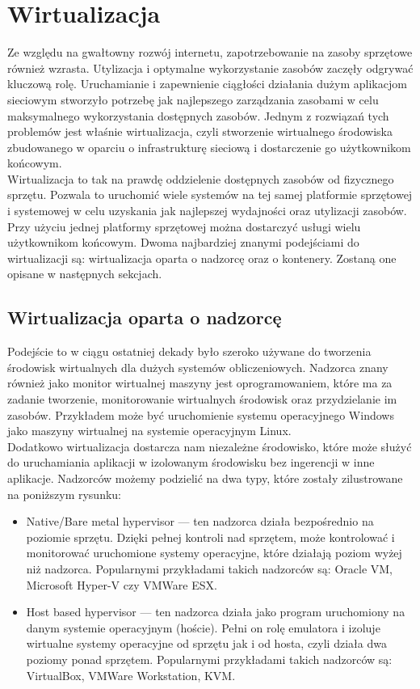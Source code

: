 \documentclass[12pt]{report}
\let\Oldsection\section
\renewcommand{\section}{\FloatBarrier\Oldsection}
\let\Oldsubsection\subsection
\renewcommand{\subsection}{\FloatBarrier\Oldsubsection}
\begin{document}
\section{Wirtualizacja}
Ze względu na gwałtowny rozwój internetu, zapotrzebowanie na zasoby sprzętowe również wzrasta. Utylizacja i optymalne wykorzystanie zasobów zaczęły odgrywać kluczową rolę. Uruchamianie i zapewnienie ciągłości działania dużym aplikacjom sieciowym stworzyło potrzebę jak najlepszego zarządzania zasobami w celu maksymalnego wykorzystania dostępnych zasobów. Jednym z rozwiązań tych problemów jest właśnie wirtualizacja, czyli stworzenie wirtualnego środowiska zbudowanego w oparciu o infrastrukturę sieciową i dostarczenie go użytkownikom końcowym. \\
\indent Wirtualizacja to tak na prawdę oddzielenie dostępnych zasobów od fizycznego sprzętu. Pozwala to uruchomić wiele systemów na tej samej platformie sprzętowej i systemowej w celu uzyskania jak najlepszej wydajności oraz utylizacji zasobów. Przy użyciu jednej platformy sprzętowej można dostarczyć usługi wielu użytkownikom końcowym. Dwoma najbardziej znanymi podejściami do wirtualizacji są: wirtualizacja oparta o nadzorcę oraz o kontenery. Zostaną one opisane w następnych sekcjach.

\subsection{Wirtualizacja oparta o nadzorcę}
Podejście to w ciągu ostatniej dekady było szeroko używane do tworzenia środowisk wirtualnych dla dużych systemów obliczeniowych. Nadzorca znany również jako monitor wirtualnej maszyny jest oprogramowaniem, które ma za zadanie tworzenie, monitorowanie wirtualnych środowisk oraz przydzielanie im zasobów. Przykładem może być uruchomienie systemu operacyjnego Windows jako maszyny wirtualnej na systemie operacyjnym Linux. \\
\indent Dodatkowo wirtualizacja dostarcza nam niezależne środowisko, które może służyć do uruchamiania aplikacji w izolowanym środowisku bez ingerencji w inne aplikacje. Nadzorców możemy podzielić na dwa typy, które zostały zilustrowane na poniższym rysunku:

\begin{itemize}
\item Native/Bare metal hypervisor --- ten nadzorca działa bezpośrednio na poziomie sprzętu. Dzięki pełnej kontroli nad sprzętem, może kontrolować i monitorować uruchomione systemy operacyjne, które działają poziom wyżej niż nadzorca. Popularnymi przykładami takich nadzorców są: Oracle VM, Microsoft Hyper-V czy VMWare ESX.
\item Host based hypervisor --- ten nadzorca działa jako program uruchomiony na danym systemie operacyjnym (hoście). Pełni on rolę emulatora i izoluje wirtualne systemy operacyjne od sprzętu jak i od hosta, czyli działa dwa poziomy ponad sprzętem. Popularnymi przykładami takich nadzorców są: VirtualBox, VMWare Workstation, KVM.
\end{itemize}
\end{document}
